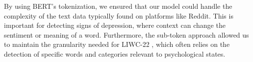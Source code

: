 By using BERT's tokenization, we ensured that our model could handle the complexity of the text data typically found on platforms like Reddit. This is important for detecting signs of depression, where context can change the sentiment or meaning of a word. Furthermore, the sub-token approach allowed us to maintain the granularity needed for LIWC-22 \cite{boyd2022development}, which often relies on the detection of specific words and categories relevant to psychological states.









